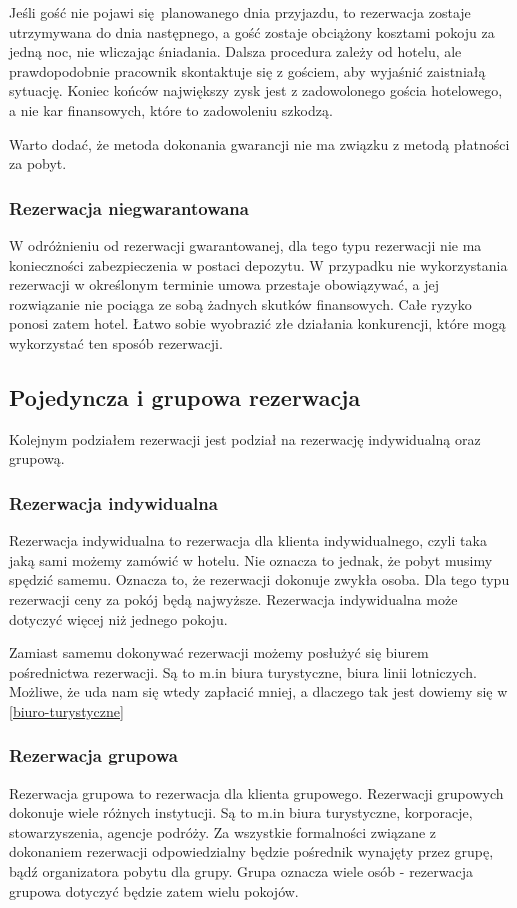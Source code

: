 \documentclass[a4paper,onecolumn,oneside,11pt,wide,floatssmall]{mwrep}
\theoremstyle{definition}
\theoremstyle{plain}%
\theoremstyle{remark}
\begin{document}
Jeśli gość nie pojawi się planowanego dnia przyjazdu, to rezerwacja zostaje 
utrzymywana do dnia następnego, a gość zostaje obciążony kosztami pokoju za 
jedną noc, nie wliczając śniadania. Dalsza procedura zależy od hotelu, ale 
prawdopodobnie pracownik skontaktuje się z gościem, aby wyjaśnić zaistniałą 
sytuację. Koniec końców największy zysk jest z zadowolonego gościa 
hotelowego, a nie kar finansowych, które to zadowoleniu szkodzą.

Warto dodać, że metoda dokonania gwarancji nie ma związku z metodą płatności 
za pobyt.

\subsubsection{Rezerwacja niegwarantowana}
W odróżnieniu od rezerwacji gwarantowanej, dla tego typu rezerwacji nie ma 
konieczności zabezpieczenia w postaci depozytu. W przypadku nie 
wykorzystania rezerwacji w określonym terminie umowa przestaje obowiązywać, 
a jej rozwiązanie nie pociąga ze sobą żadnych skutków finansowych. Całe 
ryzyko ponosi zatem hotel. Łatwo sobie wyobrazić złe działania konkurencji, 
które mogą wykorzystać ten sposób rezerwacji.

\subsection{Pojedyncza i grupowa rezerwacja}
Kolejnym podziałem rezerwacji jest podział na rezerwację indywidualną oraz 
grupową. 

\subsubsection{Rezerwacja indywidualna}
Rezerwacja indywidualna to rezerwacja dla klienta indywidualnego, czyli taka 
jaką sami możemy zamówić w hotelu. Nie oznacza to jednak, że pobyt musimy 
spędzić samemu. Oznacza to, że rezerwacji dokonuje zwykła osoba. Dla tego 
typu rezerwacji ceny za pokój będą najwyższe.
Rezerwacja indywidualna może dotyczyć więcej niż jednego pokoju.

Zamiast samemu dokonywać rezerwacji możemy posłużyć się biurem pośrednictwa 
rezerwacji. Są to m.in biura turystyczne, biura linii lotniczych. Możliwe, 
że uda nam się wtedy zapłacić mniej, a dlaczego tak jest dowiemy się w 
\ref{biuro-turystyczne}

\subsubsection{Rezerwacja grupowa}
\label{rezerwacja-grupowa}
Rezerwacja grupowa to rezerwacja dla klienta grupowego. Rezerwacji grupowych 
dokonuje wiele różnych instytucji. Są to m.in biura turystyczne, korporacje, 
stowarzyszenia, agencje podróży. Za wszystkie formalności związane z 
dokonaniem rezerwacji odpowiedzialny będzie pośrednik wynajęty przez grupę, 
bądź organizatora pobytu dla grupy. Grupa oznacza wiele osób - rezerwacja 
grupowa dotyczyć będzie zatem wielu pokojów. 
\end{document}
